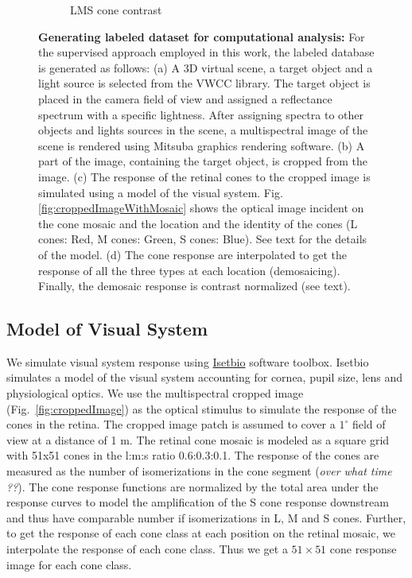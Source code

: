 \documentclass{jov}
\begin{document}
\begin{figure}
\begin{subfigure}[b]{0.2 \textwidth}
        \caption{LMS cone contrast}
        \label{fig:coneContrast}
    \end{subfigure}
    \label{fig:sceneWithCroppedImage}
    \caption{{\bf Generating labeled dataset for computational analysis:}  For the supervised approach employed in this work, the labeled database is generated as follows: (a) A 3D virtual scene, a target object and a light source is selected from the VWCC library. The target object is placed in the camera field of view and assigned a reflectance spectrum with a specific lightness. After assigning spectra to other objects and lights sources in the scene, a multispectral image of the scene is rendered using Mitsuba graphics rendering software. (b) A part of the image, containing the target object, is cropped from the image. (c) The response of the retinal cones to the cropped image is simulated using a model of the visual system. Fig.\ref{fig:croppedImageWithMosaic} shows the optical image incident on the cone mosaic and the location and the identity of the cones (L cones: Red, M cones: Green, S cones: Blue). See text for the details of the model. (d) The cone response are interpolated to get the response of all the three types at each location (demosaicing). Finally, the demosaic response is contrast normalized (see text).}
\end{figure}

\subsection{Model of Visual System} \label{method:Isetbio}
We simulate visual system response using \href{http://isetbio.org}{Isetbio} software toolbox. Isetbio simulates a model of the visual system accounting for cornea, pupil size, lens and physiological optics. We use the multispectral cropped image (Fig.~\ref{fig:croppedImage}) as the optical stimulus to simulate the response of the cones in the retina. The cropped image patch is assumed to cover a $1^{\circ}$ field of view at a distance of 1 m. The retinal cone mosaic is modeled as a square grid with 51x51 cones in the l:m:s ratio 0.6:0.3:0.1. The response of the cones are measured as the number of isomerizations in the cone segment ({\it over what time ??}). The cone response functions are normalized by the total area under the response curves to model the amplification of the S cone response downstream and thus have comparable number if isomerizations in L, M and S cones. Further, to get the response of each cone class at each position on the retinal mosaic, we interpolate the response of each cone class. Thus we get a $51 \times 51$ cone response image for each cone class.
\end{document}
